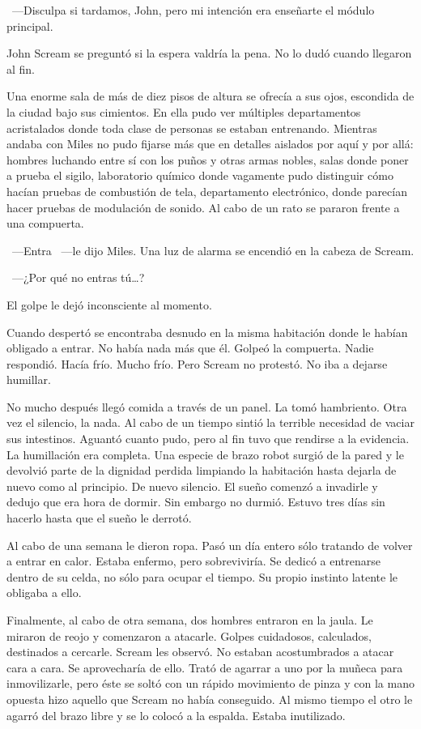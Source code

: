 ~---Disculpa si tardamos, John, pero mi intención era enseñarte el módulo principal.

John Scream se preguntó si la espera valdría la pena. No lo dudó cuando llegaron al fin.

Una enorme sala de más de diez pisos de altura se ofrecía a sus ojos, escondida de la ciudad bajo sus cimientos. En ella pudo ver múltiples departamentos acristalados donde toda clase de personas se estaban entrenando. Mientras andaba con Miles no pudo fijarse más que en detalles aislados por aquí y por allá: hombres luchando entre sí con los puños y otras armas nobles, salas donde poner a prueba el sigilo, laboratorio químico donde vagamente pudo distinguir cómo hacían pruebas de combustión de tela, departamento electrónico, donde parecían hacer pruebas de modulación de sonido. Al cabo de un rato se pararon frente a una compuerta.

~---Entra ~---le dijo Miles. Una luz de alarma se encendió en la cabeza de Scream.

~---¿Por qué no entras tú\dots{}?

El golpe le dejó inconsciente al momento.

Cuando despertó se encontraba desnudo en la misma habitación donde le habían obligado a entrar. No había nada más que él. Golpeó la compuerta. Nadie respondió. Hacía frío. Mucho frío. Pero Scream no protestó. No iba a dejarse humillar.

No mucho después llegó comida a través de un panel. La tomó hambriento. Otra vez el silencio, la nada. Al cabo de un tiempo sintió la terrible necesidad de vaciar sus intestinos. Aguantó cuanto pudo, pero al fin tuvo que rendirse a la evidencia. La humillación era completa. Una especie de brazo robot surgió de la pared y le devolvió parte de la dignidad perdida limpiando la habitación hasta dejarla de nuevo como al principio. De nuevo silencio. El sueño comenzó a invadirle y dedujo que era hora de dormir. Sin embargo no durmió. Estuvo tres días sin hacerlo hasta que el sueño le derrotó.

Al cabo de una semana le dieron ropa. Pasó un día entero sólo tratando de volver a entrar en calor. Estaba enfermo, pero sobreviviría. Se dedicó a entrenarse dentro de su celda, no sólo para ocupar el tiempo. Su propio instinto latente le obligaba a ello.

Finalmente, al cabo de otra semana, dos hombres entraron en la jaula. Le miraron de reojo y comenzaron a atacarle. Golpes cuidadosos, calculados, destinados a cercarle. Scream les observó. No estaban acostumbrados a atacar cara a cara. Se aprovecharía de ello. Trató de agarrar a uno por la muñeca para inmovilizarle, pero éste se soltó con un rápido movimiento de pinza y con la mano opuesta hizo aquello que Scream no había conseguido. Al mismo tiempo el otro le agarró del brazo libre y se lo colocó a la espalda. Estaba inutilizado.

